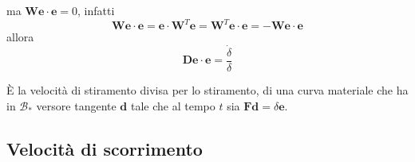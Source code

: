 \documentclass[10pt,a4paper,twoside]{book}
\begin{document}
ma $\mathbf{We} \cdotp \mathbf{e} =0$, infatti
\begin{equation*}
\mathbf{We} \cdotp \mathbf{e} =\mathbf{e} \cdotp \mathbf{W}^{T}\mathbf{e} =\mathbf{W}^{T}\mathbf{e} \cdotp \mathbf{e} =-\mathbf{We} \cdotp \mathbf{e}
\end{equation*}
allora
\begin{equation*}
\boxed{\mathbf{De} \cdotp \mathbf{e} =\frac{\dot{\delta }}{\delta }}
\end{equation*}


È la velocità di stiramento divisa per lo stiramento, di una curva materiale che ha in $\mathcal{B}_{*}$ versore tangente $\mathbf{d}$ tale che al tempo $t$ sia $\mathbf{Fd} =\delta \mathbf{e}$.
\subsection{Velocità di scorrimento}
\end{document}
